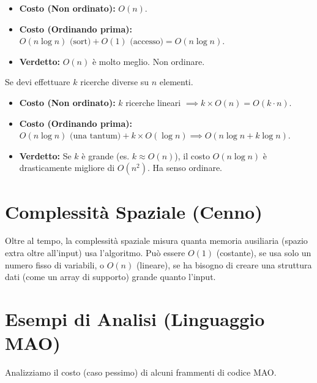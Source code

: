 \begin{example}
\begin{itemize}
    \item \textbf{Costo (Non ordinato):} $O(n)$.
    \item \textbf{Costo (Ordinando prima):} $O(n \log n) \text{ (sort)} + O(1) \text{ (accesso)} = O(n \log n)$.
    \item \textbf{Verdetto:} $O(n)$ è molto meglio. Non ordinare.
\end{itemize}
\end{example}

\begin{example}
Se devi effettuare $k$ ricerche diverse su $n$ elementi.
\begin{itemize}
    \item \textbf{Costo (Non ordinato):} $k$ ricerche lineari $\implies k \times O(n) = O(k \cdot n)$.
    \item \textbf{Costo (Ordinando prima):} $O(n \log n) \text{ (una tantum)} + k \times O(\log n) \implies O(n \log n + k \log n)$.
    \item \textbf{Verdetto:} Se $k$ è grande (es. $k \approx O(n)$), il costo $O(n \log n)$ è drasticamente migliore di $O(n^2)$. Ha senso ordinare.
\end{itemize}
\end{example}

\section{Complessità Spaziale (Cenno)}
Oltre al tempo, la complessità spaziale misura quanta memoria ausiliaria (spazio extra oltre all'input) usa l'algoritmo. Può essere $O(1)$ (costante), se usa solo un numero fisso di variabili, o $O(n)$ (lineare), se ha bisogno di creare una struttura dati (come un array di supporto) grande quanto l'input.

\section{Esempi di Analisi (Linguaggio MAO)}
Analizziamo il costo (caso pessimo) di alcuni frammenti di codice MAO.

\newcommand{\mao}[1]{\begin{lstlisting}[language={}, basicstyle=\ttfamily\bfseries, backgroundcolor=\color{codegray}, frame=tb, numbers=none, breaklines=true, tabsize=2] #1 \end{lstlisting}}


